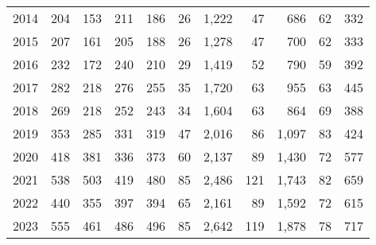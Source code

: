 \documentclass{article}
\begin{document}
\begin{table}[!ht]
\begin{tabular}{l | rrrr | rr | rr| rr}
        2014 & 204 & 153 & 211 & 186 & 26 & 1,222 & 47 & 686 & 62 & 332 \\ 
        2015 & 207 & 161 & 205 & 188 & 26 & 1,278 & 47 & 700 & 62 & 333 \\ 
        2016 & 232 & 172 & 240 & 210 & 29 & 1,419 & 52 & 790 & 59 & 392 \\ 
        2017 & 282 & 218 & 276 & 255 & 35 & 1,720 & 63 & 955 & 63 & 445 \\ 
        2018 & 269 & 218 & 252 & 243 & 34 & 1,604 & 63 & 864 & 69 & 388 \\ 
        2019 & 353 & 285 & 331 & 319 & 47 & 2,016 & 86 & 1,097 & 83 & 424 \\ 
        2020 & 418 & 381 & 336 & 373 & 60 & 2,137 & 89 & 1,430 & 72 & 577 \\ 
        2021 & 538 & 503 & 419 & 480 & 85 & 2,486 & 121 & 1,743 & 82 & 659 \\ 
        2022 & 440 & 355 & 397 & 394 & 65 & 2,161 & 89 & 1,592 & 72 & 615 \\ 
        2023 & 555 & 461 & 486 & 496 & 85 & 2,642 & 119 & 1,878 & 78 & 717 \\ 
\hline
    \end{tabular}
    \label{tab_comparison}
  
\end{table}
\end{document}

